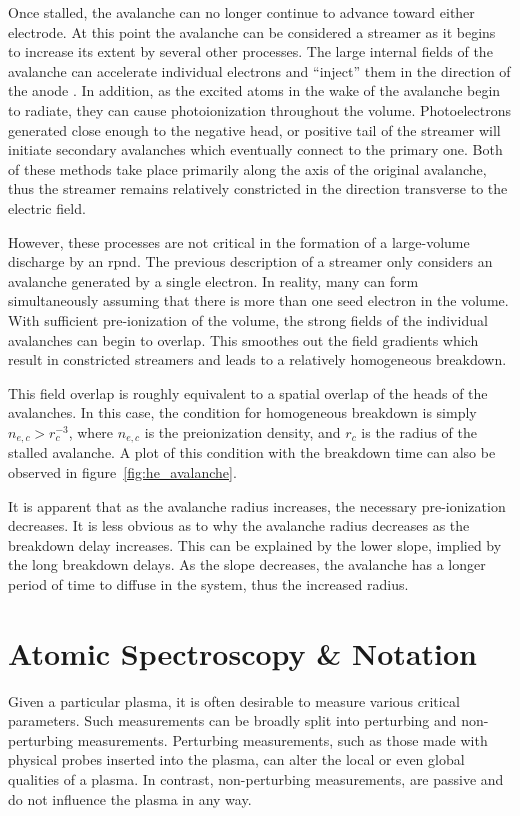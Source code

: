 {Once stalled, the avalanche can no longer continue to advance toward either
electrode. At this point the avalanche can be considered a streamer as it begins
to increase its extent by several other processes. The large internal fields of
the avalanche can accelerate individual electrons and ``inject'' them in the
direction of the anode \cite{Kunhardt1980}. In addition, as the excited atoms in
the wake of the avalanche begin to radiate, they can cause photoionization
throughout the volume. Photoelectrons generated close enough to the negative
head, or positive tail of the streamer will initiate secondary avalanches which
eventually connect to the primary one. Both of these methods take place
primarily along the axis of the original avalanche, thus the streamer remains
relatively constricted in the direction transverse to the electric field.

However, these processes are not critical in the formation of a large-volume
discharge by an \acs{rpnd}. The previous description of a streamer only
considers an avalanche generated by a single electron. In reality, many can form
simultaneously assuming that there is more than one seed electron in the volume.
With sufficient pre-ionization of the volume, the strong fields of the
individual avalanches can begin to overlap. This smoothes out the field
gradients which result in constricted streamers and leads to a relatively
homogeneous breakdown.

This field overlap is roughly equivalent to a spatial overlap of the heads of
the avalanches. In this case, the condition for homogeneous breakdown is simply
$n_{e,c} > r_c^{-3}$, where $n_{e,c}$ is the preionization density, and $r_c$ is
the radius of the stalled avalanche. A plot of this condition with the breakdown
time can also be observed in figure~\ref{fig:he_avalanche}.

It is apparent that as the avalanche radius increases, the necessary
pre-ionization decreases. It is less obvious as to why the avalanche radius
decreases as the breakdown delay increases. This can be explained by the lower
slope, implied by the long breakdown delays. As the slope decreases, the
avalanche has a longer period of time to diffuse in the system, thus the
increased radius.

\section{Atomic Spectroscopy \& Notation}

Given a particular plasma, it is often desirable to measure various critical
parameters. Such measurements can be broadly split into perturbing and
non-perturbing measurements. Perturbing measurements, such as those made with
physical probes inserted into the plasma, can alter the local or even global
qualities of a plasma. In contrast, non-perturbing measurements, are passive and
do not influence the plasma in any way.

}
